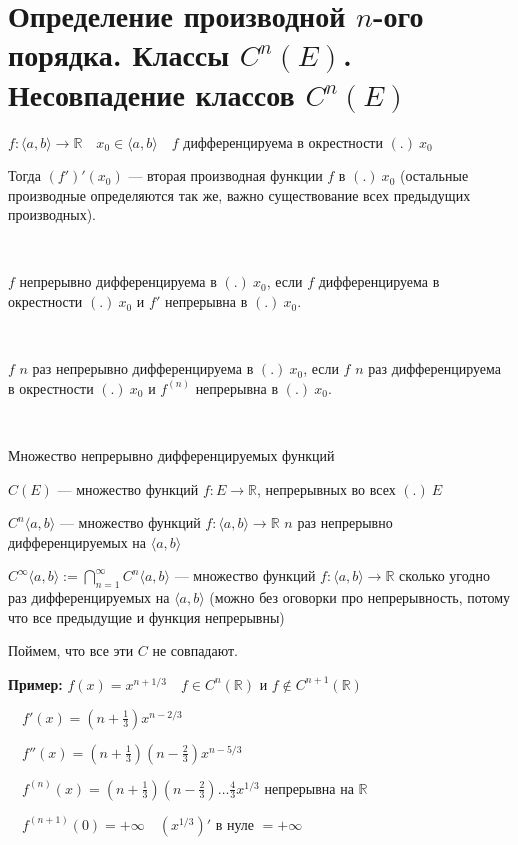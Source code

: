 \section{Определение производной $n$-ого порядка. Классы $C^n(E)$. Несовпадение классов $C^n(E)$}

\begin{conj} 
    $f: \langle a, b \rangle \rightarrow \mathbb{R} \quad x_0 \in \langle a, b \rangle \quad f$ дифференцируема в окрестности $(.) \ x_0$

    Тогда $(f')'(x_0)$ --- вторая производная функции $f$ в $(.) \ x_0$ (остальные производные определяются так же, важно существование всех предыдущих производных).
\end{conj}
\
\begin{conj}
    $f$ непрерывно дифференцируема в $(.) \ x_0$, если $f$ дифференцируема в окрестности $(.) \ x_0$ и $f'$ непрерывна в $(.) \ x_0$.
\end{conj}
\
\begin{conj}
    $f$ $n$ раз непрерывно дифференцируема в $(.) \ x_0$, если $f$ $n$ раз дифференцируема в окрестности $(.) \ x_0$ и $f^{(n)}$ непрерывна в $(.) \ x_0$.
\end{conj}
\
\begin{conj}
    Множество непрерывно дифференцируемых функций

    $C(E)$ --- множество функций $f: E \rightarrow \mathbb{R}$, непрерывных во всех $(.) \ E$

    $C^n \langle a, b \rangle$ --- множество функций $f: \langle a, b \rangle \rightarrow \mathbb{R}$ $n$ раз непрерывно дифференцируемых на $\langle a, b \rangle$

    $C^\infty \langle a, b \rangle := \bigcap\limits_{n=1}^{\infty} C^n \langle a, b \rangle$ --- множество функций $f: \langle a, b \rangle \rightarrow \mathbb{R}$ сколько угодно раз дифференцируемых на $\langle a, b \rangle$ (можно без оговорки про непрерывность, потому что все предыдущие и функция непрерывны)
\end{conj}

Поймем, что все эти $C$ не совпадают.
\par\medskip
\textbf{Пример:} $f(x) = x^{n+1/3} \quad f \in C^n(\mathbb{R})$ и $f \notin C^{n+1}(\mathbb{R})$

$\quad f'(x) = (n + \frac{1}{3})x^{n-2/3}$

$\quad f''(x) = (n + \frac{1}{3})(n - \frac{2}{3})x^{n-5/3}$

$\quad f^{(n)}(x) = (n + \frac{1}{3})(n - \frac{2}{3}) \dots \frac{4}{3} x^{1/3}$ непрерывна на $\mathbb{R}$

$\quad f^{(n+1)}(0) = +\infty \quad (x^{1/3})'$ в нуле $= +\infty$


